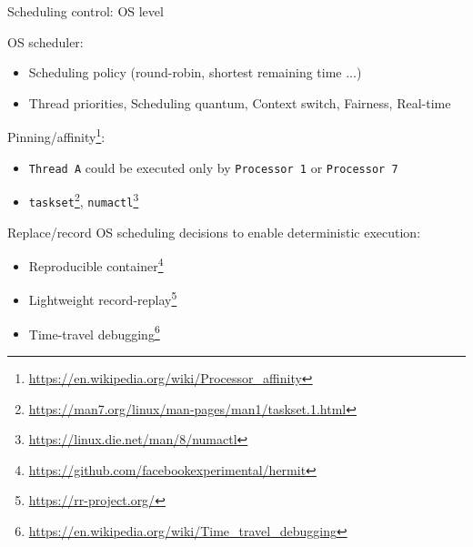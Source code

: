 \begin{frame}{Scheduling control: OS level}

OS scheduler:
\begin{itemize}
  \item Scheduling policy (round-robin, shortest remaining time ...)
  \item Thread priorities, Scheduling quantum, Context switch, Fairness, Real-time
\end{itemize}

\pause

Pinning/affinity\footnote<2->{\tiny\url{https://en.wikipedia.org/wiki/Processor_affinity}}:
\begin{itemize}
  \item \texttt{Thread A} could be executed only by \texttt{Processor 1} or \texttt{Processor 7}
  \item \texttt{taskset}\footnote<2->{\tiny\url{https://man7.org/linux/man-pages/man1/taskset.1.html}}, \texttt{numactl}\footnote<2->{\tiny\url{https://linux.die.net/man/8/numactl}}
\end{itemize}

\pause

Replace/record OS scheduling decisions to enable deterministic execution:
\begin{itemize}
  \item Reproducible container\footnote<3->{\tiny\url{https://github.com/facebookexperimental/hermit}}
  \item Lightweight record-replay\footnote<3->{\tiny\url{https://rr-project.org/}}
  \item Time-travel debugging\footnote<3->{\tiny\url{https://en.wikipedia.org/wiki/Time_travel_debugging}}
\end{itemize}

\end{frame}



